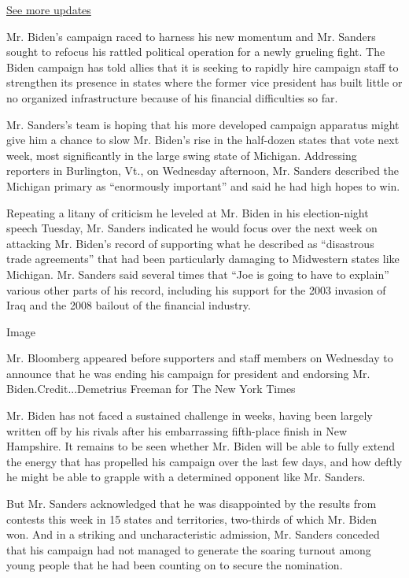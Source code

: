 \href{https://www.nytimes.com/2020/07/31/us/elections/biden-vs-trump.html?action=click\&pgtype=Article\&state=default\&region=MAIN_CONTENT_1\&context=storylines_live_updates}{See
more updates}

Mr. Biden's campaign raced to harness his new momentum and Mr. Sanders
sought to refocus his rattled political operation for a newly grueling
fight. The Biden campaign has told allies that it is seeking to rapidly
hire campaign staff to strengthen its presence in states where the
former vice president has built little or no organized infrastructure
because of his financial difficulties so far.

Mr. Sanders's team is hoping that his more developed campaign apparatus
might give him a chance to slow Mr. Biden's rise in the half-dozen
states that vote next week, most significantly in the large swing state
of Michigan. Addressing reporters in Burlington, Vt., on Wednesday
afternoon, Mr. Sanders described the Michigan primary as ``enormously
important'' and said he had high hopes to win.

Repeating a litany of criticism he leveled at Mr. Biden in his
election-night speech Tuesday, Mr. Sanders indicated he would focus over
the next week on attacking Mr. Biden's record of supporting what he
described as ``disastrous trade agreements'' that had been particularly
damaging to Midwestern states like Michigan. Mr. Sanders said several
times that ``Joe is going to have to explain'' various other parts of
his record, including his support for the 2003 invasion of Iraq and the
2008 bailout of the financial industry.

Image

Mr. Bloomberg appeared before supporters and staff members on Wednesday
to announce that he was ending his campaign for president and endorsing
Mr. Biden.Credit...Demetrius Freeman for The New York Times

Mr. Biden has not faced a sustained challenge in weeks, having been
largely written off by his rivals after his embarrassing fifth-place
finish in New Hampshire. It remains to be seen whether Mr. Biden will be
able to fully extend the energy that has propelled his campaign over the
last few days, and how deftly he might be able to grapple with a
determined opponent like Mr. Sanders.

But Mr. Sanders acknowledged that he was disappointed by the results
from contests this week in 15 states and territories, two-thirds of
which Mr. Biden won. And in a striking and uncharacteristic admission,
Mr. Sanders conceded that his campaign had not managed to generate the
soaring turnout among young people that he had been counting on to
secure the nomination.

